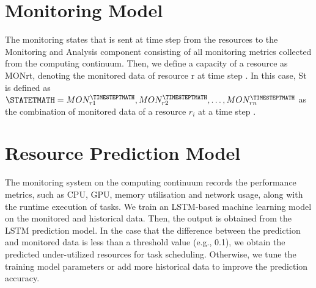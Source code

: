 


    \section{Monitoring Model}
    \label{sec:monitoring-model}

        The monitoring states \STATET that is sent at time step \TIMESTEPT from the resources to the Monitoring and Analysis component consisting of all monitoring metrics collected from the computing continuum. 
        Then, we define a capacity of a resource as MONrt, denoting the monitored data of resource r at time step \TIMESTEPT. 
        In this case, St is defined as $\STATETMATH = {MON_{r1}^\TIMESTEPTMATH, MON_{r2}^\TIMESTEPTMATH, \dots, MON_{rn}^\TIMESTEPTMATH}$ as the combination of monitored data of a resource $r_i$ at a time step \TIMESTEPT.


    \section{Resource Prediction Model}
    \label{sec:resource-prediction-model}

        The monitoring system on the computing continuum records the performance metrics, such as CPU, GPU, memory utilisation and network usage, along with the runtime execution of tasks. We train an LSTM-based machine learning model on the monitored and historical data. Then, the output is obtained from the LSTM prediction model. In the case that the difference between the prediction and monitored data is less than a threshold value (e.g., 0.1), we obtain the predicted under-utilized resources for task scheduling. Otherwise, we tune the training model parameters or add more historical data to improve the prediction accuracy.


